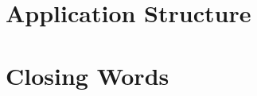 \documentclass[10pt, a4paper]{article}
\begin{document}
    \section{Application Structure}

    \section{Closing Words}

    \listoffigures
\end{document}
